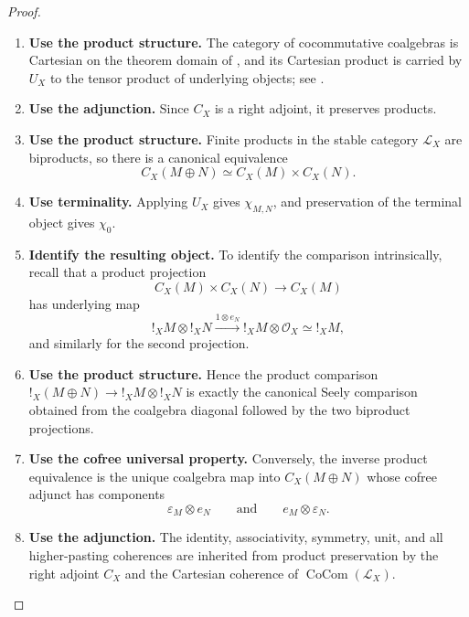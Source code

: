 \begin{proof}
\leavevmode
\begin{enumerate}[label=\textup{(\arabic*)}]
    \item \textbf{Use the product structure.}
    The category of cocommutative coalgebras is Cartesian on the theorem domain of
    , and its Cartesian product is carried by
    \(U_X\) to the tensor product of underlying objects; see
    \cite{BachmannBurklund2026Coalgebras}.

    \item \textbf{Use the adjunction.}
    Since \(C_X\) is a right adjoint, it preserves products.

    \item \textbf{Use the product structure.}
    Finite products in the stable category \(\mathcal L_X\) are biproducts, so there is a canonical
    equivalence
    \[
        C_X(M\oplus N)
        \simeq
        C_X(M)\times C_X(N).
    \]

    \item \textbf{Use terminality.}
    Applying \(U_X\) gives \(\chi_{M,N}\), and preservation of the terminal object gives
    \(\chi_0\).

    \item \textbf{Identify the resulting object.}
    To identify the comparison intrinsically, recall that a product projection
    \[
        C_X(M)\times C_X(N)\longrightarrow C_X(M)
    \]
    has underlying map
    \[
        !_XM\otimes !_XN
        \xrightarrow{1\otimes e_N}
        !_XM\otimes\mathcal O_X
        \simeq
        !_XM,
    \]
    and similarly for the second projection.

    \item \textbf{Use the product structure.}
    Hence the product comparison \(!_{X}(M\oplus N)\to !_XM\otimes !_XN\) is exactly the canonical Seely comparison obtained
    from the coalgebra diagonal followed by the two biproduct projections.

    \item \textbf{Use the cofree universal property.}
    Conversely, the inverse product equivalence is the unique coalgebra map into \(C_X(M\oplus N)\)
    whose cofree adjunct has components
    \[
        \varepsilon_M\otimes e_N
        \qquad\text{and}\qquad
        e_M\otimes\varepsilon_N.
    \]

    \item \textbf{Use the adjunction.}
    The identity, associativity, symmetry, unit, and all higher-pasting coherences are inherited
    from product preservation by the right adjoint \(C_X\) and the Cartesian coherence of
    \(\operatorname{CoCom}(\mathcal L_X)\).
\end{enumerate}
\end{proof}


